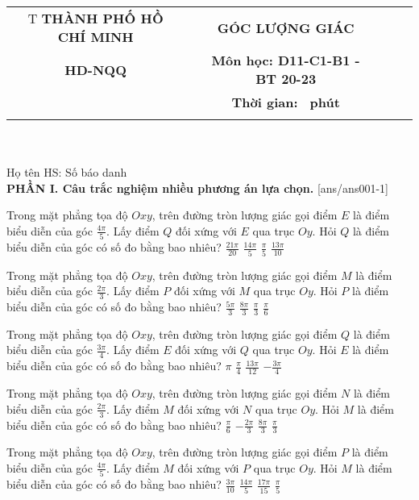 \documentclass[12pt,a4paper]{article}
\newcommand{\tenso}{THÀNH PHỐ HỒ CHÍ MINH}
\newcommand{\tentruong}{HD-NQQ}
\newcommand{\tenkythi}{GÓC LƯỢNG GIÁC}
\newcommand{\tenmonthi}{Môn học: D11-C1-B1 - BT 20-23}
\newcommand{\thoigian}{}
\newcommand{\tieude}[1]{
   \begin{tabular}{cm{1cm}cm{3cm}cm{3cm}}T
    {\bf \tenso} & & {\bf \tenkythi} \\
    {\bf \tentruong} & & {\bf \tenmonthi}\\
    && {\bf Thời gian: \bf \thoigian \, phút}\\
    && { \fbox{\bf Mã đề: #1}}
   \end{tabular}\\\\
    
   {Họ tên HS: \dotfill Số báo danh \dotfill}\\
}
\newcommand{\chantrang}[2]{\rfoot{Trang \thepage $-$ Mã đề #2}}
\begin{document}


\tieude{001}
\setcounter{page}{1}
{\bf PHẦN I. Câu trắc nghiệm nhiều phương án lựa chọn.}
\setcounter{ex}{0}
[ans/ans001-1]
\begin{ex}
   Trong mặt phẳng tọa độ ${Oxy}$, trên đường tròn lượng giác gọi điểm ${E}$ là điểm biểu diễn của góc $\frac{4 \pi}{5}$. Lấy điểm ${Q}$ đối xứng với ${E}$ qua trục ${Oy}$. Hỏi ${Q}$ là điểm biểu diễn của góc có số đo bằng bao nhiêu? 
\choice
{ $\frac{21 \pi}{20}$ }
   { $\frac{14 \pi}{5}$ }
     { \True $\frac{\pi}{5}$ }
    { $\frac{13 \pi}{10}$ }
\end{ex}

\begin{ex}
   Trong mặt phẳng tọa độ ${Oxy}$, trên đường tròn lượng giác gọi điểm ${M}$ là điểm biểu diễn của góc $\frac{2 \pi}{3}$. Lấy điểm ${P}$ đối xứng với ${M}$ qua trục ${Oy}$. Hỏi ${P}$ là điểm biểu diễn của góc có số đo bằng bao nhiêu? 
\choice
{ $\frac{5 \pi}{3}$ }
   { $\frac{8 \pi}{3}$ }
     { \True $\frac{\pi}{3}$ }
    { $\frac{\pi}{6}$ }
\end{ex}

\begin{ex}
   Trong mặt phẳng tọa độ ${Oxy}$, trên đường tròn lượng giác gọi điểm ${Q}$ là điểm biểu diễn của góc $\frac{3 \pi}{4}$. Lấy điểm ${E}$ đối xứng với ${Q}$ qua trục ${Oy}$. Hỏi ${E}$ là điểm biểu diễn của góc có số đo bằng bao nhiêu? 
\choice
{ $\pi$ }
   { \True $\frac{\pi}{4}$ }
     { $\frac{13 \pi}{12}$ }
    { $- \frac{3 \pi}{4}$ }
\end{ex}

\begin{ex}
   Trong mặt phẳng tọa độ ${Oxy}$, trên đường tròn lượng giác gọi điểm ${N}$ là điểm biểu diễn của góc $\frac{2 \pi}{3}$. Lấy điểm ${M}$ đối xứng với ${N}$ qua trục ${Oy}$. Hỏi ${M}$ là điểm biểu diễn của góc có số đo bằng bao nhiêu? 
\choice
{ $\frac{\pi}{6}$ }
   { $- \frac{2 \pi}{3}$ }
     { $\frac{8 \pi}{3}$ }
    { \True $\frac{\pi}{3}$ }
\end{ex}

\begin{ex}
   Trong mặt phẳng tọa độ ${Oxy}$, trên đường tròn lượng giác gọi điểm ${P}$ là điểm biểu diễn của góc $\frac{4 \pi}{5}$. Lấy điểm ${M}$ đối xứng với ${P}$ qua trục ${Oy}$. Hỏi ${M}$ là điểm biểu diễn của góc có số đo bằng bao nhiêu? 
\choice
{ $\frac{3 \pi}{10}$ }
   { $\frac{14 \pi}{5}$ }
     { $\frac{17 \pi}{15}$ }
    { \True $\frac{\pi}{5}$ }
\end{ex}
\end{document}

